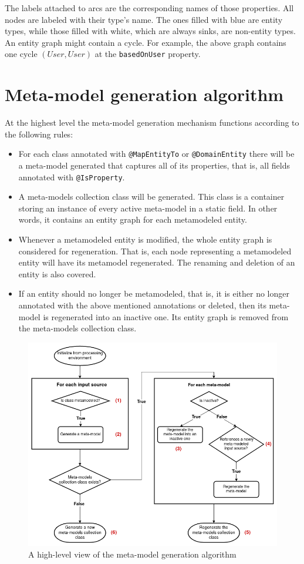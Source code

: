The labels attached to arcs are the corresponding names of those properties. All nodes are labeled with their type’s name. The ones filled with blue are entity types, while those filled with white, which are always sinks, are non-entity types. An entity graph might contain a cycle. For example, the above graph contains one cycle $(User, User)$ at the \texttt{basedOnUser} property.


\section{Meta-model generation algorithm}
At the highest level the meta-model generation mechanism functions according to the following rules:
\begin{itemize}
    \item For each class annotated with \texttt{@MapEntityTo} or \texttt{@DomainEntity} there will be a meta-model generated that captures all of its properties, that is, all fields annotated with \texttt{@IsProperty}.
    \item A meta-models collection class will be generated. This class is a container storing an instance of every active meta-model in a static field. In other words, it contains an entity graph for each metamodeled entity.
    \item Whenever a metamodeled entity is modified, the whole entity graph is considered for regeneration. That is, each node representing a metamodeled entity will have its metamodel regenerated. The renaming and deletion of an entity is also covered.
    \item If an entity should no longer be metamodeled, that is, it is either no longer annotated with the above mentioned annotations or deleted, then its meta-model is regenerated into an inactive one. Its entity graph is removed from the meta-models collection class.
\end{itemize}


\begin{figure}[H]\centering
    \includegraphics[scale=0.55]{images/algorithm.drawio.png}
    \caption{A high-level view of the meta-model generation algorithm}\label{fig:algorithm}
\end{figure}

